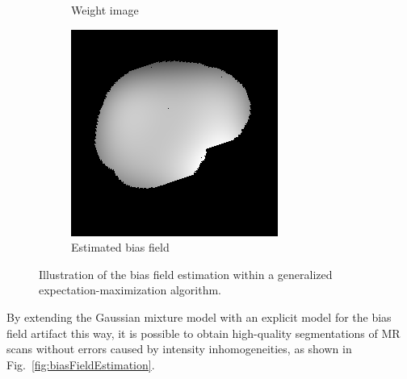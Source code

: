 \documentclass[10pt,twoside]{book}
\begin{document}
\begin{figure}
\begin{subfigure}{0.3\textwidth}
    \caption{Weight image} 
    \label{fig:biasFieldEquationIllustration_d}
  \end{subfigure}
  \hspace{2ex}
  \begin{subfigure}{0.3\textwidth}
    \centering
    \includegraphics[width=\textwidth]{biasFieldEstimationEstimatedBiasField}
    \caption{Estimated bias field} 
    \label{fig:biasFieldEquationIllustration_e}
  \end{subfigure}
  \caption{Illustration of the bias field estimation within a generalized expectation-maximization algorithm.}
  \label{fig:biasFieldEquationIllustration}
\end{figure}


By extending the Gaussian mixture model with an explicit model for the bias field artifact this way, it is possible to obtain high-quality 
segmentations of MR scans without errors caused by intensity inhomogeneities, as shown in Fig.~\ref{fig:biasFieldEstimation}.
\end{document}
